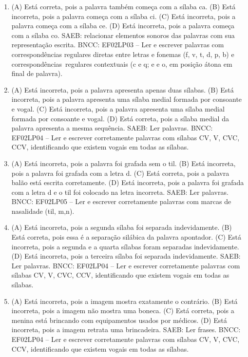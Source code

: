 \begin{enumerate}
\item
(A) Está correta, pois a palavra também começa com a sílaba ca.
(B) Está incorreta, pois a palavra começa com a sílaba ci.
(C) Está incorreta, pois a palavra começa com a sílaba ce.
(D) Está incorreta, pois a palavra começa com a sílaba co.
SAEB: relacionar elementos sonoros das palavras com sua representação escrita.
BNCC: EF02LP03 -- Ler e escrever palavras com correspondências
regulares diretas entre letras e fonemas (f, v, t, d, p, b) e
correspondências~regulares contextuais (c e q; e e o, em posição átona
em final de palavra).

\item
(A) Está incorreta, pois a palavra apresenta apenas duas sílabas.
(B) Está incorreta, pois a palavra apresenta uma sílaba medial formada por consoante e vogal.
(C) Está incorreta, pois a palavra apresenta uma sílaba medial formada por consoante e vogal.
(D) Está correta, pois a sílaba medial da palavra apresenta a mesma sequência.
SAEB: Ler palavras.
BNCC: EF02LP04 -- Ler e escrever corretamente palavras com
sílabas CV, V, CVC, CCV, identificando que existem vogais em todas as
sílabas.

\item
(A) Está incorreta, pois a palavra foi grafada sem o til.
(B) Está incorreta, pois a palavra foi grafada com a letra d.
(C) Está correta, pois a palavra balão está escrita corretamente.
(D) Está incorreta, pois a palavra foi grafada com a letra d e o til foi colocado na letra incorreta.
SAEB: Ler palavras.
BNCC: EF02LP05 -- Ler e escrever corretamente palavras com marcas
de nasalidade (til, m,n).

\item
(A) Está incorreta, pois a segunda sílaba foi separada indevidamente.
(B) Está correta, pois essa é a separação silábica da palavra apontador.
(C) Está incorreta, pois a segunda e a quarta sílabas foram separadas indevidamente.
(D) Está incorreta, pois a terceira sílaba foi separada indevidamente.
SAEB: Ler palavras.
BNCC: EF02LP04 -- Ler e escrever corretamente palavras com
sílabas CV, V, CVC, CCV, identificando que existem vogais em todas as
sílabas.

\item
(A) Está incorreta, pois a imagem mostra exatamente o contrário.
(B) Está incorreta, pois a imagem não mostra uma boneca.
(C) Está correta, pois a menina está brincando com equipamentos usados por médicos.
(D) Está incorreta, pois a imagem retrata uma brincadeira.
SAEB: Ler frases.
BNCC: EF02LP04 -- Ler e escrever corretamente palavras com sílabas
CV, V, CVC, CCV, identificando que existem vogais em todas as sílabas.


\end{enumerate}
